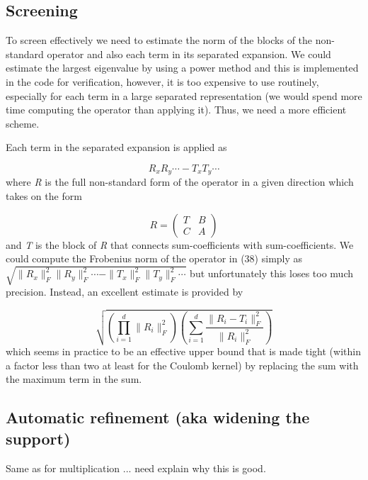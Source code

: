 \documentclass[letterpaper]{article}
\begin{document}
\subsection{Screening}
To screen effectively we need to estimate the norm of the blocks of the non-standard operator and also each term in its
separated expansion. We could estimate the largest eigenvalue by using a power method and this is implemented in the
code for verification, however, it is too expensive to use routinely, especially for each term in a large separated
representation (we would spend more time computing the operator than applying it). Thus, we need a more efficient
scheme.

Each term in the separated expansion is applied as 

\begin{equation}\label{seq:refText37}
R_{x}R_{y}\cdots -T_{x}T_{y}\cdots 
\end{equation}
where \textit{R} is the full non-standard form of the operator in a given direction which takes on the form 

\begin{equation}
R=\left(\begin{matrix}T&B\\C&A\end{matrix}\right)
\end{equation}
and \textit{T} is the block of\textit{ R }that connects sum-coefficients with sum-coefficients. We could compute the
Frobenius norm of the operator in (38) simply as  $\sqrt{\|R_{x}\|_{F}^{2}\|R_{y}\|_{F}^{2}\cdots
-\|T_{x}\|_{F}^{2}\|T_{y}\|_{F}^{2}\cdots }$ but unfortunately this loses too much precision. Instead, an excellent
estimate is provided by 

\begin{equation}
\sqrt{\left(\prod _{i=1}^{d}{\|R_{i}\|_{F}^{2}}\right)\left(\sum
_{i=1}^{d}{\frac{\|R_{i}-T_{i}\|_{F}^{2}}{\|R_{i}\|_{F}^{2}}}\right)}
\end{equation}
which seems in practice to be an effective upper bound that is made tight (within a factor less than two at least for
the Coulomb kernel) by replacing the sum with the maximum term in the sum.

\subsection[Automatic refinement (aka widening the support)]{Automatic refinement (aka widening the support)}
Same as for multiplication ... need explain why this is good.
\end{document}
